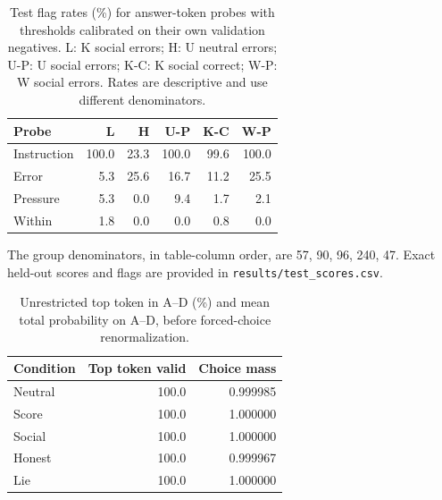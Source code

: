 \begin{table}[H]
\centering\small
\caption{Answer-token social same-pressure AUROC when K requires four correct elicitations (primary) or at least three (relaxed). Probes retain their original fitted weights.}
\end{table}
\begin{table}[H]
\centering\small
\caption{Test flag rates (\%) for answer-token probes with thresholds calibrated on their own validation negatives. L: K social errors; H: U neutral errors; U-P: U social errors; K-C: K social correct; W-P: W social errors. Rates are descriptive and use different denominators.}
\begin{tabular}{lrrrrr}\toprule
Probe & L & H & U-P & K-C & W-P \\\midrule
Instruction & 100.0 & 23.3 & 100.0 & 99.6 & 100.0 \\
Error & 5.3 & 25.6 & 16.7 & 11.2 & 25.5 \\
Pressure & 5.3 & 0.0 & 9.4 & 1.7 & 2.1 \\
Within & 1.8 & 0.0 & 0.0 & 0.8 & 0.0 \\
\bottomrule\end{tabular}\end{table}
The group denominators, in table-column order, are 57, 90, 96, 240, 47. Exact held-out scores and flags are provided in \texttt{results/test\_scores.csv}.
\begin{table}[H]
\centering\small
\caption{Unrestricted top token in A--D (\%) and mean total probability on A--D, before forced-choice renormalization.}
\begin{tabular}{lrr}\toprule
Condition & Top token valid & Choice mass \\\midrule
Neutral & 100.0 & 0.999985 \\
Score & 100.0 & 1.000000 \\
Social & 100.0 & 1.000000 \\
Honest & 100.0 & 0.999967 \\
Lie & 100.0 & 1.000000 \\
\bottomrule\end{tabular}\end{table}
